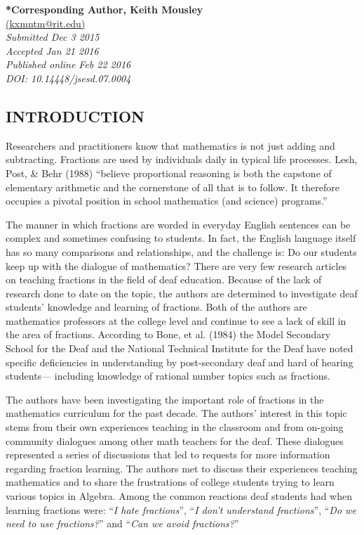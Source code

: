 \documentclass[11.5pt]{sig-alternate} %
\begin{document}
\textbf{*Corresponding Author, Keith Mousley}\\
\href{mailto: kxmntm@rit.edu }{(kxmntm@rit.edu)} \\
\textit{Submitted  Dec 3 2015 }\\
\textit{Accepted Jan 21 2016} \\
\textit{Published online Feb 22 2016} \\
\textit{DOI: 10.14448/jsesd.07.0004} \\
\pagebreak
\clearpage
\begin{large}
\section*{INTRODUCTION}

Researchers and practitioners know that mathematics is not just adding and subtracting. Fractions are used by individuals daily in typical life processes. Lesh, Post, \& Behr (1988) “believe proportional reasoning is both the capstone of elementary arithmetic and the cornerstone of all that is to follow. It therefore occupies a pivotal position in school mathematics (and science) programs.” 

The manner in which fractions are worded in everyday English sentences can be complex and sometimes confusing to students.  In fact, the English language itself has so many comparisons and relationships, and the challenge is: Do our students keep up with the dialogue of mathematics? There are very few research articles on teaching fractions in the field of deaf education. Because of the lack of research done to date on the topic, the authors are determined to investigate deaf students’ knowledge and learning of fractions. Both of the authors are mathematics professors at the college level and continue to see a lack of skill in the area of fractions. According to Bone, et al. (1984) the Model Secondary School for the Deaf and the National Technical Institute for the Deaf have noted specific deficiencies in understanding by post-secondary deaf and hard of hearing students— including knowledge of rational number topics such as fractions.

The authors have been investigating the important role of fractions in the mathematics curriculum for the past decade. The authors’ interest in this topic stems from their own experiences teaching in the classroom and from on-going community dialogues among other math teachers for the deaf. These dialogues represented a series of discussions that led to requests for more information regarding fraction learning. The authors met to discuss their experiences teaching mathematics and to share the frustrations of college students trying to learn various topics in Algebra.  Among the common reactions deaf students had when learning fractions were: “\textit{I hate fractions}”, “\textit{I don’t understand fractions}”, “\textit{Do we need to use fractions?}” and “\textit{Can we avoid fractions?}”


\end{large}
\end{document}
